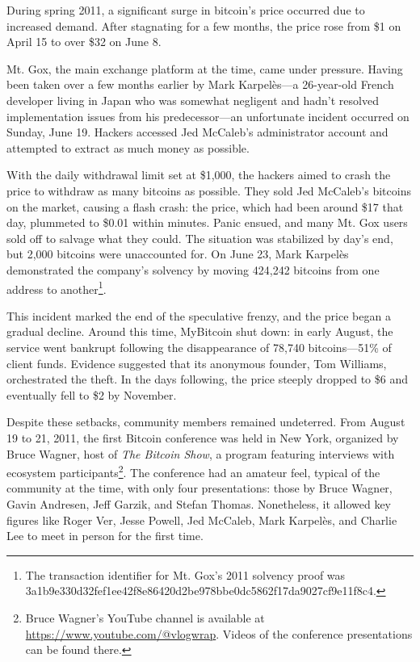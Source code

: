 \documentclass[
  a5paper,
  smalldemyvopaper,10pt,twoside,onecolumn,openright,extrafontsizes,hidelinks]{memoir}
\newlength\drop
\begin{document}
During spring 2011, a significant surge in bitcoin's price occurred due
to increased demand. After stagnating for a few months, the price rose
from \$1 on April 15 to over \$32 on June 8.

Mt. Gox, the main exchange platform at the time, came under pressure.
Having been taken over a few months earlier by Mark Karpelès---a
26-year-old French developer living in Japan who was somewhat negligent
and hadn't resolved implementation issues from his predecessor---an
unfortunate incident occurred on Sunday, June 19. Hackers accessed Jed
McCaleb's administrator account and attempted to extract as much money
as possible.

With the daily withdrawal limit set at \$1,000, the hackers aimed to
crash the price to withdraw as many bitcoins as possible. They sold Jed
McCaleb's bitcoins on the market, causing a flash crash: the price,
which had been around \$17 that day, plummeted to \$0.01 within minutes.
Panic ensued, and many Mt. Gox users sold off to salvage what they
could. The situation was stabilized by day's end, but 2,000 bitcoins
were unaccounted for. On June 23, Mark Karpelès demonstrated the
company's solvency by moving 424,242 bitcoins from one address to
another\footnote{The transaction identifier for Mt. Gox's 2011 solvency
  proof was
  3a1b9e330d32fef1ee42f8e86420d2be978bbe0dc5862f17da9027cf9e11f8c4.}.

This incident marked the end of the speculative frenzy, and the price
began a gradual decline. Around this time, MyBitcoin shut down: in early
August, the service went bankrupt following the disappearance of 78,740
bitcoins---51\% of client funds. Evidence suggested that its anonymous
founder, Tom Williams, orchestrated the theft. In the days following,
the price steeply dropped to \$6 and eventually fell to \$2 by November.

Despite these setbacks, community members remained undeterred. From
August 19 to 21, 2011, the first Bitcoin conference was held in New
York, organized by Bruce Wagner, host of \emph{The Bitcoin Show}, a
program featuring interviews with ecosystem participants\footnote{Bruce
  Wagner's YouTube channel is available at
  \url{https://www.youtube.com/@vlogwrap}. Videos of the conference
  presentations can be found there.}. The conference had an amateur
feel, typical of the community at the time, with only four
presentations: those by Bruce Wagner, Gavin Andresen, Jeff Garzik, and
Stefan Thomas. Nonetheless, it allowed key figures like Roger Ver, Jesse
Powell, Jed McCaleb, Mark Karpelès, and Charlie Lee to meet in person
for the first time.
\end{document}
